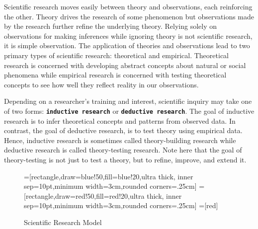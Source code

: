 Scientific research moves easily between theory and observations, each reinforcing the other. Theory drives the research of some phenomenon but observations made by the research further refine the underlying theory. Relying solely on observations for making inferences while ignoring theory is not scientific research, it is simple observation. The application of theories and observations lead to two primary types of scientific research: theoretical and empirical. Theoretical research is concerned with developing abstract concepts about natural or social phenomena while empirical research is concerned with testing theoretical concepts to see how well they reflect reality in our observations. 

Depending on a researcher's training and interest, scientific inquiry may take one of two forms: \textbf{\texttt{inductive research}} or \textbf{\texttt{deductive research}}. The goal of inductive research is to infer theoretical concepts and patterns from observed data. In contrast, the goal of deductive research, is to test theory using empirical data. Hence, inductive research is sometimes called theory-building research while deductive research is called theory-testing research. Note here that the goal of theory-testing is not just to test a theory, but to refine, improve, and extend it. 

\begin{center}
	\begin{figure}[H]
		=[rectangle,draw=blue!50,fill=blue!20,ultra thick,
			inner sep=10pt,minimum width=3cm,rounded corners=.25cm]
		=[rectangle,draw=red!50,fill=red!20,ultra thick,
			inner sep=10pt,minimum width=3cm,rounded corners=.25cm]
		=[red]
		\caption{Scientific Research Model}
		\label{fig01.01}
	\end{figure}
\end{center}

